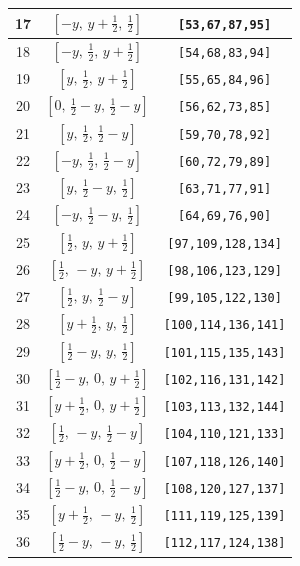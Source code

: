 \documentclass[fleqn,8pt]{jsarticle}
\begin{document}
\begin{longtable}{ccc}
17 & $\left[ - y,\, y + \frac{1}{2},\, \frac{1}{2} \right]$ & {\tt [53,67,87,95]} \\ \hline
18 & $\left[ - y,\, \frac{1}{2},\, y + \frac{1}{2} \right]$ & {\tt [54,68,83,94]} \\ \hline
19 & $\left[ y,\, \frac{1}{2},\, y + \frac{1}{2} \right]$ & {\tt [55,65,84,96]} \\ \hline
20 & $\left[ 0,\, \frac{1}{2} - y,\, \frac{1}{2} - y \right]$ & {\tt [56,62,73,85]} \\ \hline
21 & $\left[ y,\, \frac{1}{2},\, \frac{1}{2} - y \right]$ & {\tt [59,70,78,92]} \\ \hline
22 & $\left[ - y,\, \frac{1}{2},\, \frac{1}{2} - y \right]$ & {\tt [60,72,79,89]} \\ \hline
23 & $\left[ y,\, \frac{1}{2} - y,\, \frac{1}{2} \right]$ & {\tt [63,71,77,91]} \\ \hline
24 & $\left[ - y,\, \frac{1}{2} - y,\, \frac{1}{2} \right]$ & {\tt [64,69,76,90]} \\ \hline
25 & $\left[ \frac{1}{2},\, y,\, y + \frac{1}{2} \right]$ & {\tt [97,109,128,134]} \\ \hline
26 & $\left[ \frac{1}{2},\, - y,\, y + \frac{1}{2} \right]$ & {\tt [98,106,123,129]} \\ \hline
27 & $\left[ \frac{1}{2},\, y,\, \frac{1}{2} - y \right]$ & {\tt [99,105,122,130]} \\ \hline
28 & $\left[ y + \frac{1}{2},\, y,\, \frac{1}{2} \right]$ & {\tt [100,114,136,141]} \\ \hline
29 & $\left[ \frac{1}{2} - y,\, y,\, \frac{1}{2} \right]$ & {\tt [101,115,135,143]} \\ \hline
30 & $\left[ \frac{1}{2} - y,\, 0,\, y + \frac{1}{2} \right]$ & {\tt [102,116,131,142]} \\ \hline
31 & $\left[ y + \frac{1}{2},\, 0,\, y + \frac{1}{2} \right]$ & {\tt [103,113,132,144]} \\ \hline
32 & $\left[ \frac{1}{2},\, - y,\, \frac{1}{2} - y \right]$ & {\tt [104,110,121,133]} \\ \hline
33 & $\left[ y + \frac{1}{2},\, 0,\, \frac{1}{2} - y \right]$ & {\tt [107,118,126,140]} \\ \hline
34 & $\left[ \frac{1}{2} - y,\, 0,\, \frac{1}{2} - y \right]$ & {\tt [108,120,127,137]} \\ \hline
35 & $\left[ y + \frac{1}{2},\, - y,\, \frac{1}{2} \right]$ & {\tt [111,119,125,139]} \\ \hline
36 & $\left[ \frac{1}{2} - y,\, - y,\, \frac{1}{2} \right]$ & {\tt [112,117,124,138]} \\ \hline

\end{longtable}
\end{document}
